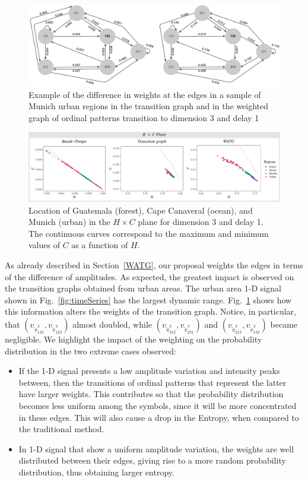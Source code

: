 \documentclass[journal]{IEEEtran}
\begin{document}
\begin{figure}[hbt]
	\includegraphics[width=2\columnwidth]{Figures/graphs.pdf}
	\caption{Example of the difference in weights at the edges in a sample of Munich urban regions in the transition graph and in the weighted graph of ordinal patterns
		transition to dimension 3 and delay 1}
	\label{fig:graphs}
\end{figure}

\begin{figure}[hbt]
	\includegraphics[width=2\columnwidth]{Figures/HCAnalysis.pdf}
	\caption{Location of Guatemala (forest), Cape Canaveral (ocean), and Munich (urban) in the $H \times C$ plane for dimension 3 and delay 1. 
		The continuous curves correspond to the maximum and minimum values of $C$ as a function of $H$.}
	\label{fig:plotsHC}
\end{figure}

As already described in Section~\ref{WATG}, our proposal weights the edges in terms of the difference of amplitudes.
As expected, the greatest impact is observed on the transition graphs obtained from urban areas.
The urban area 1-D signal shown in Fig.~\ref{fig:timeSeries} has the largest dynamic range.
Fig.~\ref{fig:graphs} shows how this information alters the weights of the transition graph.
Notice, in particular, that 
$(v_{\widetilde \pi^3_{123}}, v_{\widetilde \pi^3_{123}})$ almost doubled, while 
$(v_{\widetilde \pi^3_{312}}, v_{\widetilde \pi^3_{231}})$ and $(v_{\widetilde \pi^3_{213}}, v_{\widetilde \pi^3_{132}})$ became negligible.
We highlight the impact of the weighting on the probability distribution in the two extreme cases observed:
\begin{itemize}
	\item If the 1-D signal presents a low amplitude variation and intensity peaks between, then the transitions of ordinal patterns that represent the latter have larger weights.
	This contributes so that the probability distribution becomes less uniform among the symbols, since it will be more concentrated in these edges.
	This will also cause a drop in the Entropy, when compared to the traditional method.
	\item In 1-D signal that show a uniform amplitude variation, the weights are well distributed between their edges, giving rise to a more random probability distribution, thus obtaining larger entropy.
\end{itemize}
\end{document}
